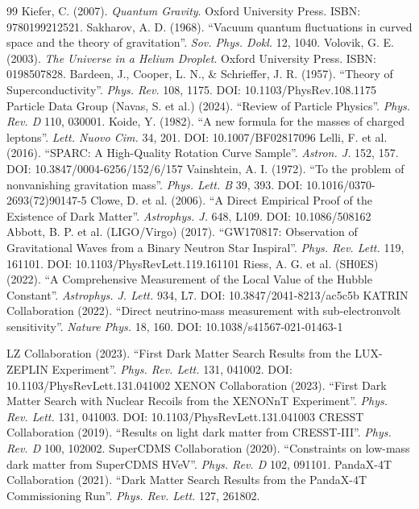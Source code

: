 \documentclass[a4paper,12pt]{article}
\begin{document}
\begin{thebibliography}{99}
 Kiefer, C. (2007). \textit{Quantum Gravity}. Oxford University Press. ISBN: 9780199212521.
 Sakharov, A. D. (1968). ``Vacuum quantum fluctuations in curved space and the theory of gravitation''. \textit{Sov. Phys. Dokl.} 12, 1040.
 Volovik, G. E. (2003). \textit{The Universe in a Helium Droplet}. Oxford University Press. ISBN: 0198507828.
 Bardeen, J., Cooper, L. N., \& Schrieffer, J. R. (1957). ``Theory of Superconductivity''. \textit{Phys. Rev.} 108, 1175. DOI: 10.1103/PhysRev.108.1175
 Particle Data Group (Navas, S. et al.) (2024). ``Review of Particle Physics''. \textit{Phys. Rev. D} 110, 030001.
 Koide, Y. (1982). ``A new formula for the masses of charged leptons''. \textit{Lett. Nuovo Cim.} 34, 201. DOI: 10.1007/BF02817096
 Lelli, F. et al. (2016). ``SPARC: A High-Quality Rotation Curve Sample''. \textit{Astron. J.} 152, 157. DOI: 10.3847/0004-6256/152/6/157
 Vainshtein, A. I. (1972). ``To the problem of nonvanishing gravitation mass''. \textit{Phys. Lett. B} 39, 393. DOI: 10.1016/0370-2693(72)90147-5
 Clowe, D. et al. (2006). ``A Direct Empirical Proof of the Existence of Dark Matter''. \textit{Astrophys. J.} 648, L109. DOI: 10.1086/508162
 Abbott, B. P. et al. (LIGO/Virgo) (2017). ``GW170817: Observation of Gravitational Waves from a Binary Neutron Star Inspiral''. \textit{Phys. Rev. Lett.} 119, 161101. DOI: 10.1103/PhysRevLett.119.161101
 Riess, A. G. et al. (SH0ES) (2022). ``A Comprehensive Measurement of the Local Value of the Hubble Constant''. \textit{Astrophys. J. Lett.} 934, L7. DOI: 10.3847/2041-8213/ac5c5b
 KATRIN Collaboration (2022). ``Direct neutrino-mass measurement with sub-electronvolt sensitivity''. \textit{Nature Phys.} 18, 160. DOI: 10.1038/s41567-021-01463-1


 LZ Collaboration (2023). ``First Dark Matter Search Results from the LUX-ZEPLIN Experiment''. \textit{Phys. Rev. Lett.} 131, 041002. DOI: 10.1103/PhysRevLett.131.041002
 XENON Collaboration (2023). ``First Dark Matter Search with Nuclear Recoils from the XENONnT Experiment''. \textit{Phys. Rev. Lett.} 131, 041003. DOI: 10.1103/PhysRevLett.131.041003
 CRESST Collaboration (2019). ``Results on light dark matter from CRESST-III''. \textit{Phys. Rev. D} 100, 102002.
 SuperCDMS Collaboration (2020). ``Constraints on low-mass dark matter from SuperCDMS HVeV''. \textit{Phys. Rev. D} 102, 091101.
 PandaX-4T Collaboration (2021). ``Dark Matter Search Results from the PandaX-4T Commissioning Run''. \textit{Phys. Rev. Lett.} 127, 261802.


\end{thebibliography}
\end{document}
